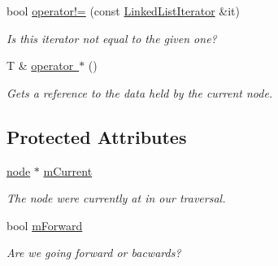 \begin{DoxyCompactItemize}
bool \mbox{\hyperlink{classssuds_1_1_linked_list_1_1_linked_list_iterator_a0cfd4b59e14a42e601cef60289e885be}{operator!=}} (const \mbox{\hyperlink{classssuds_1_1_linked_list_1_1_linked_list_iterator}{Linked\+List\+Iterator}} \&it)
\begin{DoxyCompactList}\small\item\em Is this iterator not equal to the given one? \end{DoxyCompactList}\item 
\mbox{\label{classssuds_1_1_linked_list_1_1_linked_list_iterator_a57f6bcd94eac48a7389aea9814949225}} 
T \& \mbox{\hyperlink{classssuds_1_1_linked_list_1_1_linked_list_iterator_a57f6bcd94eac48a7389aea9814949225}{operator $\ast$}} ()
\begin{DoxyCompactList}\small\item\em Gets a reference to the data held by the current node. \end{DoxyCompactList}\end{DoxyCompactItemize}
\subsection*{Protected Attributes}
\begin{DoxyCompactItemize}
\item 
\mbox{\label{classssuds_1_1_linked_list_1_1_linked_list_iterator_a0762621331ad87ad09985eb79f7453b4}} 
\mbox{\hyperlink{classssuds_1_1_linked_list_1_1node}{node}} $\ast$ \mbox{\hyperlink{classssuds_1_1_linked_list_1_1_linked_list_iterator_a0762621331ad87ad09985eb79f7453b4}{m\+Current}}
\begin{DoxyCompactList}\small\item\em The node we\textquotesingle{}re currently at in our traversal. \end{DoxyCompactList}\item 
\mbox{\label{classssuds_1_1_linked_list_1_1_linked_list_iterator_aba332fc6d077b6ac9fa55842c7cab19c}} 
bool \mbox{\hyperlink{classssuds_1_1_linked_list_1_1_linked_list_iterator_aba332fc6d077b6ac9fa55842c7cab19c}{m\+Forward}}
\begin{DoxyCompactList}\small\item\em Are we going forward or bacwards? \end{DoxyCompactList}\end{DoxyCompactItemize}


